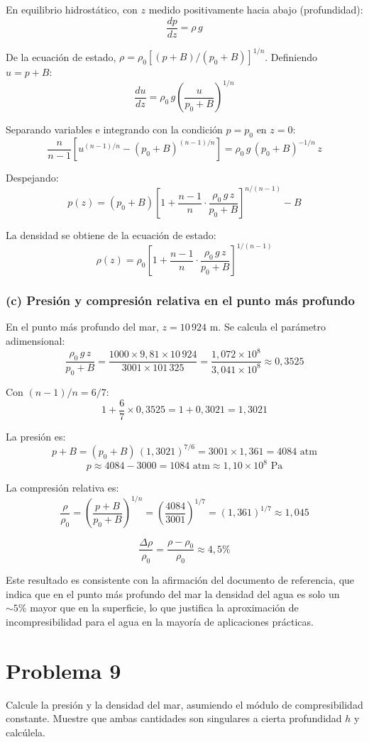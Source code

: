 \documentclass[a4paper]{article}
\begin{document}
En equilibrio hidrostático, con $z$ medido positivamente hacia abajo (profundidad):
$$
\frac{dp}{dz} = \rho\, g
$$

De la ecuación de estado, $\rho = \rho_0\left[(p+B)/(p_0+B)\right]^{1/n}$. Definiendo $u = p + B$:
$$
\frac{du}{dz} = \rho_0\, g\left(\frac{u}{p_0 + B}\right)^{1/n}
$$

Separando variables e integrando con la condición $p = p_0$ en $z = 0$:
$$
\frac{n}{n-1}\left[u^{(n-1)/n} - (p_0+B)^{(n-1)/n}\right] = \rho_0\, g\,(p_0+B)^{-1/n}\, z
$$

Despejando:
$$
\boxed{p(z) = (p_0 + B)\left[1 + \frac{n-1}{n}\cdot\frac{\rho_0\, g\, z}{p_0 + B}\right]^{n/(n-1)} - B}
$$

La densidad se obtiene de la ecuación de estado:
$$
\boxed{\rho(z) = \rho_0\left[1 + \frac{n-1}{n}\cdot\frac{\rho_0\, g\, z}{p_0 + B}\right]^{1/(n-1)}}
$$

\subsubsection{(c) Presión y compresión relativa en el punto más profundo}

En el punto más profundo del mar, $z = 10\,924$ m. Se calcula el parámetro adimensional:
$$
\frac{\rho_0\, g\, z}{p_0 + B} = \frac{1000 \times 9{,}81 \times 10\,924}{3001 \times 101\,325} = \frac{1{,}072 \times 10^8}{3{,}041 \times 10^8} \approx 0{,}3525
$$

Con $(n-1)/n = 6/7$:
$$
1 + \frac{6}{7}\times 0{,}3525 = 1 + 0{,}3021 = 1{,}3021
$$

La presión es:
$$
p + B = (p_0 + B)\,(1{,}3021)^{7/6} = 3001 \times 1{,}361 = 4084 \text{ atm}
$$
$$
\boxed{p \approx 4084 - 3000 = 1084 \text{ atm} \approx 1{,}10 \times 10^8 \text{ Pa}}
$$

La compresión relativa es:
$$
\frac{\rho}{\rho_0} = \left(\frac{p + B}{p_0 + B}\right)^{1/n} = \left(\frac{4084}{3001}\right)^{1/7} = (1{,}361)^{1/7} \approx 1{,}045
$$

$$
\boxed{\frac{\Delta\rho}{\rho_0} = \frac{\rho - \rho_0}{\rho_0} \approx 4{,}5\%}
$$

Este resultado es consistente con la afirmación del documento de referencia, que indica que en el punto más profundo del mar la densidad del agua es solo un $\sim 5\%$ mayor que en la superficie, lo que justifica la aproximación de incompresibilidad para el agua en la mayoría de aplicaciones prácticas.


\section{Problema 9}
Calcule la presión y la densidad del mar, asumiendo el módulo de compresibilidad constante. Muestre que ambas cantidades son singulares a cierta profundidad $h$ y calcúlela.
\end{document}
